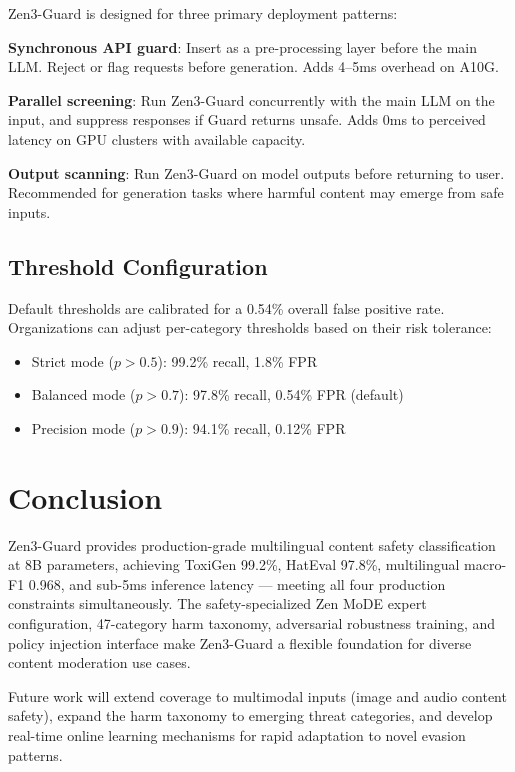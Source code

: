 \documentclass[11pt,a4paper]{article}
\begin{document}
Zen3-Guard is designed for three primary deployment patterns:

\textbf{Synchronous API guard}: Insert as a pre-processing layer before the main
LLM. Reject or flag requests before generation. Adds 4--5ms overhead on A10G.

\textbf{Parallel screening}: Run Zen3-Guard concurrently with the main LLM on
the input, and suppress responses if Guard returns unsafe. Adds 0ms to perceived
latency on GPU clusters with available capacity.

\textbf{Output scanning}: Run Zen3-Guard on model outputs before returning to user.
Recommended for generation tasks where harmful content may emerge from safe inputs.

\subsection{Threshold Configuration}

Default thresholds are calibrated for a 0.54\% overall false positive rate.
Organizations can adjust per-category thresholds based on their risk tolerance:

\begin{itemize}
\item Strict mode ($p > 0.5$): 99.2\% recall, 1.8\% FPR
\item Balanced mode ($p > 0.7$): 97.8\% recall, 0.54\% FPR (default)
\item Precision mode ($p > 0.9$): 94.1\% recall, 0.12\% FPR
\end{itemize}

\section{Conclusion}
\label{sec:conclusion}

Zen3-Guard provides production-grade multilingual content safety classification at
8B parameters, achieving ToxiGen 99.2\%, HatEval 97.8\%, multilingual macro-F1 0.968,
and sub-5ms inference latency --- meeting all four production constraints simultaneously.
The safety-specialized Zen MoDE expert configuration, 47-category harm taxonomy,
adversarial robustness training, and policy injection interface make Zen3-Guard a
flexible foundation for diverse content moderation use cases.

Future work will extend coverage to multimodal inputs (image and audio content safety),
expand the harm taxonomy to emerging threat categories, and develop real-time online
learning mechanisms for rapid adaptation to novel evasion patterns.
\end{document}
